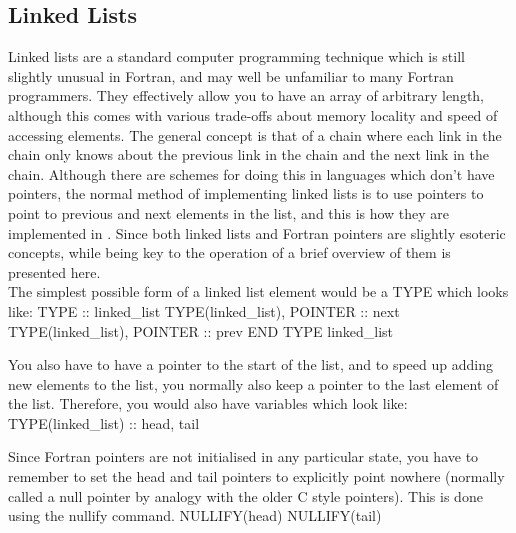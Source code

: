 \documentclass[12pt,a4paper]{article}
\newcommand{\EPOCH}{{\color{warwickdark}\fontfamily{phv}\selectfont{EPOCH}}}
\newenvironment{boxverbatim}{\lboxverbatim{none}}{\endlboxverbatim}
\begin{document}
\subsection{Linked Lists}
Linked lists are a standard computer programming technique which is still
slightly unusual in Fortran, and may well be unfamiliar to many Fortran
programmers. They effectively allow you to have an array of arbitrary length,
although this comes with various trade-offs about memory locality and speed of
accessing elements. The general concept is that of a chain where each link in
the chain only knows about the previous link in the chain and the next link in
the chain. Although there are schemes for doing this in languages which don't
have pointers, the normal method of implementing linked lists is to use
pointers to point to previous and next elements in the list, and this is how
they are implemented in {\EPOCH}. Since both linked lists and Fortran pointers
are slightly esoteric concepts, while being key to the operation of {\EPOCH} a
brief overview of them is presented here.\\

The simplest possible form of a linked list element would be a TYPE which
looks like:
\begin{boxverbatim}
TYPE :: linked_list
  TYPE(linked_list), POINTER :: next
  TYPE(linked_list), POINTER :: prev
END TYPE linked_list
\end{boxverbatim}

You also have to have a pointer to the start of the list, and to speed up
adding new elements to the list, you normally also keep a pointer to the
last element of the list. Therefore, you would also have variables which look
like:
\begin{boxverbatim}
TYPE(linked_list) :: head, tail
\end{boxverbatim}

Since Fortran pointers are not initialised in any particular state, you have
to remember to set the head and tail pointers to explicitly point nowhere
(normally called a null pointer by analogy with the older C style
pointers). This is done using the nullify command.
\begin{boxverbatim}
NULLIFY(head)
NULLIFY(tail)
\end{boxverbatim}
\end{document}
